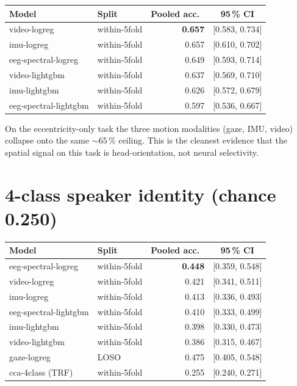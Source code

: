 \begin{table}[ht]
\centering
\begin{tabular}{llrc}
\toprule
Model & Split & Pooled acc.\ & 95\,\% CI \\
\midrule
video-logreg             & within-5fold & \textbf{0.657} & [0.583, 0.734] \\
imu-logreg               & within-5fold & 0.657 & [0.610, 0.702] \\
eeg-spectral-logreg      & within-5fold & 0.649 & [0.593, 0.714] \\
video-lightgbm           & within-5fold & 0.637 & [0.569, 0.710] \\
imu-lightgbm             & within-5fold & 0.626 & [0.572, 0.679] \\
eeg-spectral-lightgbm    & within-5fold & 0.597 & [0.536, 0.667] \\
\bottomrule
\end{tabular}
\end{table}

On the eccentricity-only task the three motion modalities (gaze, IMU,
video) collapse onto the same $\sim 65$\,\% ceiling. This is the
cleanest evidence that the spatial signal on this task is
head-orientation, not neural selectivity.

\section{4-class speaker identity (chance 0.250)}

\begin{table}[ht]
\centering
\begin{tabular}{llrc}
\toprule
Model & Split & Pooled acc.\ & 95\,\% CI \\
\midrule
eeg-spectral-logreg      & within-5fold & \textbf{0.448} & [0.359, 0.548] \\
video-logreg             & within-5fold & 0.421 & [0.341, 0.511] \\
imu-logreg               & within-5fold & 0.413 & [0.336, 0.493] \\
eeg-spectral-lightgbm    & within-5fold & 0.410 & [0.333, 0.499] \\
imu-lightgbm             & within-5fold & 0.398 & [0.330, 0.473] \\
video-lightgbm           & within-5fold & 0.386 & [0.315, 0.467] \\
gaze-logreg              & LOSO         & 0.475 & [0.405, 0.548] \\
cca-4class (TRF)         & within-5fold & 0.255 & [0.240, 0.271] \\
\bottomrule
\end{tabular}
\end{table}

